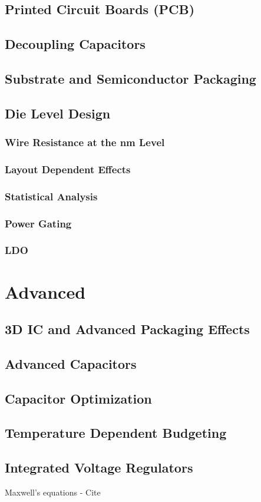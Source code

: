 \documentclass{book}
\begin{document}
\section{Printed Circuit Boards (PCB)}
\section{Decoupling Capacitors}
\section{Substrate and Semiconductor Packaging}
\section{Die Level Design}
\subsection{Wire Resistance at the nm Level}
\subsection{Layout Dependent Effects}
\subsection{Statistical Analysis}
\subsection{Power Gating}
\subsection{LDO}

\chapter{Advanced}
\section{3D IC and Advanced Packaging Effects}
\section{Advanced Capacitors}
\section{Capacitor Optimization}
\section{Temperature Dependent Budgeting}
\section{Integrated Voltage Regulators}

\begin{thebibliography}{99}
Maxwell's equations - Cite
\end{thebibliography}
\end{document}
